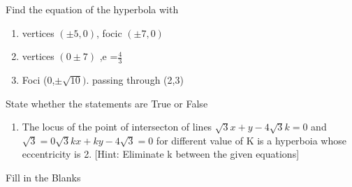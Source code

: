 Find the equation of the hyperbola with
\begin{enumerate}[label=\thesection.\arabic*,ref=\thesection.\theenumi,resume*]
	 \item  vertices $(\pm5,0)$, focic $(\pm 7,0)$
	 \item vertices $(0\pm7)$ ,e =$\frac{4}{3}$ 
	 \item  Foci (0,$\pm\sqrt{10})$. passing through (2,3)
\end{enumerate}
State whether the statements are True or False 
\begin{enumerate}[label=\thesection.\arabic*,ref=\thesection.\theenumi,resume*]
\item The locus of the point of intersecton of lines $\sqrt{3}x+y-4\sqrt{3}k=0$ and $\sqrt{3}=0\sqrt{3}kx+ky-4\sqrt{3}=0$ for different value of K is a hyperboia whose eccentricity is 2.
[Hint: Eliminate k between the given equations]
\end{enumerate}
Fill in the Blanks
